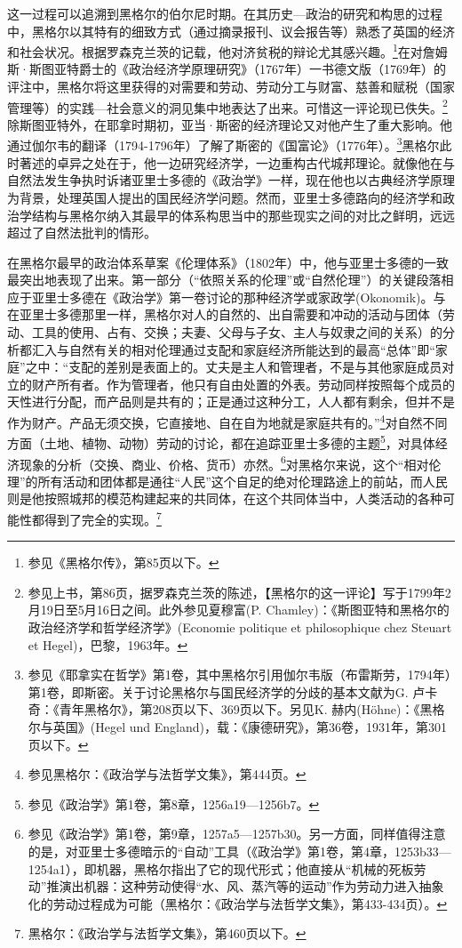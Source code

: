 这一过程可以追溯到黑格尔的伯尔尼时期。在其历史—政治的研究和构思的过程中，黑格尔以其特有的细致方式（通过摘录报刊、议会报告等）熟悉了英国的经济和社会状况。根据罗森克兰茨的记载，他对济贫税的辩论尤其感兴趣。\footnote{参见《黑格尔传》，第85页以下。}在对詹姆斯·斯图亚特爵士的《政治经济学原理研究》（1767年）一书德文版（1769年）的评注中，黑格尔将这里获得的对需要和劳动、劳动分工与财富、慈善和赋税（国家管理等）的实践—社会意义的洞见集中地表达了出来。可惜这一评论现已佚失。\footnote{参见上书，第86页，据罗森克兰茨的陈述，【黑格尔的这一评论】写于1799年2月19日至5月16日之间。此外参见夏穆富(P. Chamley)：《斯图亚特和黑格尔的政治经济学和哲学经济学》(Economie politique et philosophique chez Steuart et Hegel)，巴黎，1963年。}除斯图亚特外，在耶拿时期初，亚当·斯密的经济理论又对他产生了重大影响。他通过伽尔韦的翻译（1794-1796年）了解了斯密的《国富论》（1776年）。\footnote{参见《耶拿实在哲学》第1卷，其中黑格尔引用伽尔韦版（布雷斯劳，1794年）第1卷，即斯密。关于讨论黑格尔与国民经济学的分歧的基本文献为G. 卢卡奇：《青年黑格尔》，第208页以下、369页以下。另见K. 赫内(Höhne)：《黑格尔与英国》(Hegel und England)，载：《康德研究》，第36卷，1931年，第301页以下。}黑格尔此时著述的卓异之处在于，他一边研究经济学，一边重构古代城邦理论。就像他在与自然法发生争执时诉诸亚里士多德的《政治学》一样，现在他也以古典经济学原理为背景，处理英国人提出的国民经济学问题。然而，亚里士多德路向的经济学和政治学结构与黑格尔纳入其最早的体系构思当中的那些现实之间的对比之鲜明，远远超过了自然法批判的情形。

在黑格尔最早的政治体系草案《伦理体系》（1802年）中，他与亚里士多德的一致最突出地表现了出来。第一部分（“依照关系的伦理”或“自然伦理”）的关键段落相应于亚里士多德在《政治学》第一卷讨论的那种经济学或家政学(Okonomik)。与在亚里士多德那里一样，黑格尔对人的自然的、出自需要和冲动的活动与团体（劳动、工具的使用、占有、交换；夫妻、父母与子女、主人与奴隶之间的关系）的分析都汇入与自然有关的相对伦理通过支配和家庭经济所能达到的最高“总体”即“家庭”之中：“支配的差别是表面上的。丈夫是主人和管理者，不是与其他家庭成员对立的财产所有者。作为管理者，他只有自由处置的外表。劳动同样按照每个成员的天性进行分配，而产品则是共有的；正是通过这种分工，人人都有剩余，但并不是作为财产。产品无须交换，它直接地、自在自为地就是家庭共有的。”\footnote{参见黑格尔：《政治学与法哲学文集》，第444页。}对自然不同方面（土地、植物、动物）劳动的讨论，都在追踪亚里士多德的主题\footnote{参见《政治学》第1卷，第8章，1256a19—1256b7。}，对具体经济现象的分析（交换、商业、价格、货币）亦然。\footnote{参见《政治学》第1卷，第9章，1257a5—1257b30。另一方面，同样值得注意的是，对亚里士多德暗示的“自动”工具（《政治学》第1卷，第4章，1253b33—1254a1），即机器，黑格尔指出了它的现代形式；他直接从“机械的死板劳动”推演出机器：这种劳动使得“水、风、蒸汽等的运动”作为劳动力进入抽象化的劳动过程成为可能（黑格尔：《政治学与法哲学文集》，第433-434页）。}对黑格尔来说，这个“相对伦理”的所有活动和团体都是通往“人民”这个自足的绝对伦理路途上的前站，而人民则是他按照城邦的模范构建起来的共同体，在这个共同体当中，人类活动的各种可能性都得到了完全的实现。\footnote{黑格尔：《政治学与法哲学文集》，第460页以下。}

